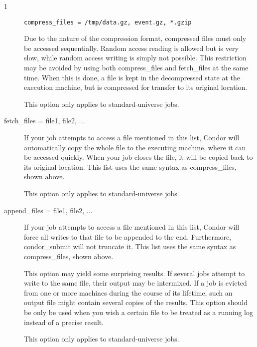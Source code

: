 \begin{ManPage}{\label{man-condor-submit}}{1}
\begin{description}
\begin{verbatim}
compress_files = /tmp/data.gz, event.gz, *.gzip
\end{verbatim}

Due to the nature of the compression format, compressed files must only
be accessed sequentially.  Random access reading is allowed but is very slow,
while random access writing is simply not possible.  This restriction may be
avoided by using both compress\_files and fetch\_files at the same time.  When
this is done, a file is kept in the decompressed state at the execution
machine, but is compressed for transfer to its original location.

This option only applies to standard-universe jobs.


\item[fetch\_files = file1, file2, ...]

If your job attempts to access a file mentioned in this list,
Condor will automatically copy the whole file to the executing machine,
where it can be accessed quickly.  When your job closes the file,
it will be copied back to its original location.
This list uses the same syntax as compress\_files, shown above.

This option only applies to standard-universe jobs.


\item[append\_files = file1, file2, ...]

If your job attempts to access a file mentioned in this list,
Condor will force all writes to that file to be appended to the end.
Furthermore, condor\_submit will not truncate it.
This list uses the same syntax as compress\_files, shown above.

This option may yield some surprising results.  If several
jobs attempt to write to the same file, their output may be intermixed.
If a job is evicted from one or more machines during the course of its
lifetime, such an output file might contain several copies of the results.
This option should be only be used when you wish a certain file to be
treated as a running log instead of a precise result.

This option only applies to standard-universe jobs.



\end{description}
\end{ManPage}
